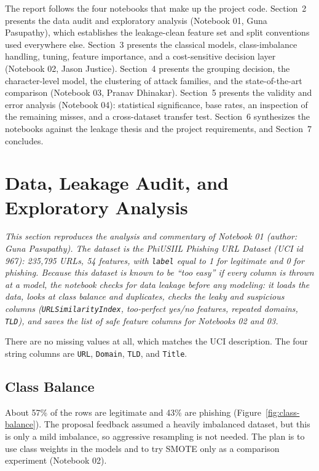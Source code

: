 \documentclass[stu,12pt,floatsintext]{apa7}
\newcommand{\code}[1]{\texttt{#1}}
\begin{document}
The report follows the four notebooks that make up the project code.
Section~2 presents the data audit and exploratory analysis (Notebook 01,
Guna Pasupathy), which establishes the leakage-clean feature set and split
conventions used everywhere else. Section~3 presents the classical models,
class-imbalance handling, tuning, feature importance, and a
cost-sensitive decision layer (Notebook 02, Jason Justice). Section~4
presents the grouping decision, the character-level model, the clustering
of attack families, and the state-of-the-art comparison (Notebook 03,
Pranav Dhinakar). Section~5 presents the validity and error analysis
(Notebook 04): statistical significance, base rates, an inspection of the
remaining misses, and a cross-dataset transfer test. Section~6
synthesizes the notebooks against the leakage thesis and the project
requirements, and Section~7 concludes.

\section{Data, Leakage Audit, and Exploratory Analysis}

\emph{This section reproduces the analysis and commentary of Notebook 01
(author: Guna Pasupathy). The dataset is the PhiUSIIL Phishing URL Dataset
(UCI id 967): 235{,}795 URLs, 54 features, with \code{label} equal to 1
for legitimate and 0 for phishing. Because this dataset is known to be
``too easy'' if every column is thrown at a model, the notebook checks for
data leakage before any modeling: it loads the data, looks at class
balance and duplicates, checks the leaky and suspicious columns
(\code{URLSimilarityIndex}, too-perfect yes/no features, repeated domains,
\code{TLD}), and saves the list of safe feature columns for Notebooks 02
and 03.}

There are no missing values at all, which matches the UCI description. The
four string columns are \code{URL}, \code{Domain}, \code{TLD}, and
\code{Title}.

\subsection{Class Balance}

About 57\% of the rows are legitimate and 43\% are phishing
(Figure~\ref{fig:class-balance}). The proposal feedback assumed a heavily
imbalanced dataset, but this is only a mild imbalance, so aggressive
resampling is not needed. The plan is to use class weights in the models
and to try SMOTE only as a comparison experiment (Notebook 02).
\end{document}
